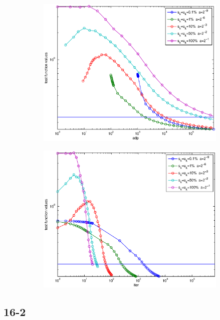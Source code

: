 \documentclass[12pt]{article}
\begin{document}
	\begin{figure}[H]
	\begin{subfigure}[b]{.5\linewidth}
		        \includegraphics[width=4in]{GenFigures/16-1b-1.eps}
	\end{subfigure}%
	\begin{subfigure}[b]{.5\linewidth}
		        \includegraphics[width=4in]{GenFigures/16-1b-2.eps}
	\end{subfigure}%

	\end{figure}
	\subsection{16-2}
\end{document}
